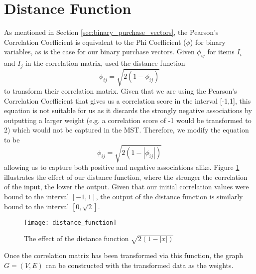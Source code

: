 \section{Distance Function}
\label{sec:distance}
As mentioned in Section \ref{sec:binary_purchase_vectors}, the Pearson's Correlation Coefficient is equivalent to the Phi Coefficient ($\phi$) for binary variables, as is the case for our binary purchase vectors. Given $\phi_{ij}$ for items $I_i$ and $I_j$ in the correlation matrix,  used the distance function
\[
\phi_{ij} = \sqrt{2(1-\phi_{ij})}
\]
to transform their correlation matrix. Given that we are using the Pearson's Correlation Coefficient that gives us a correlation score in the interval [-1,1], this equation is not suitable for us as it discards the strongly negative associations by outputting a larger weight (e.g. a correlation score of -1 would be transformed to 2) which would not be captured in the MST. Therefore, we modify the equation to be
\[
\phi_{ij} = \sqrt{2(1-|\phi_{ij}|)}
\]
allowing us to capture both positive and negative associations alike. Figure \ref{fig:distance_function} illustrates the effect of our distance function, where the stronger the correlation of the input, the lower the output. Given that our initial correlation values were bound to the interval $[-1,1]$, the output of the distance function is similarly bound to the interval $[0, \sqrt{2}]$.
\begin{figure}[H]
\centering
\texttt{[image: distance\_function]}
\label{fig:distance_function}
\caption{The effect of the distance function $\sqrt{2(1-|x|)}$}
\end{figure}
\noindent Once the correlation matrix has been transformed via this function, the graph $G=(V,E)$ can be constructed with the transformed data as the weights.



